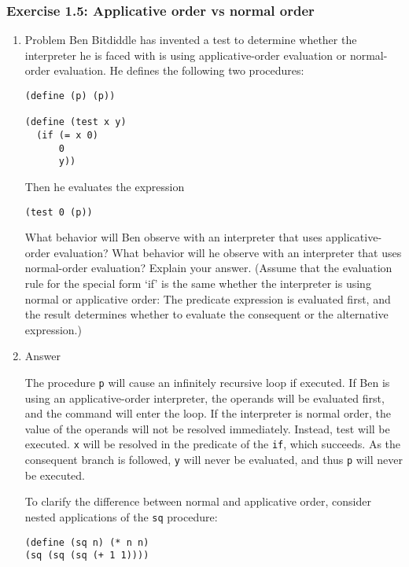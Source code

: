 \documentclass[11pt]{article}
\begin{document}
\subsubsection{Exercise 1.5: Applicative order vs normal order}
\label{sec-1-1-5}
\begin{enumerate}
\item Problem
\label{sec-1-1-5-1}
Ben Bitdiddle has invented a test to determine whether the
interpreter he is faced with is using applicative-order
evaluation or normal-order evaluation.  He defines the following
two procedures:

\begin{verbatim}
(define (p) (p))

(define (test x y)
  (if (= x 0)
      0
      y))
\end{verbatim}

Then he evaluates the expression

\begin{verbatim}
(test 0 (p))
\end{verbatim}

What behavior will Ben observe with an interpreter that uses
applicative-order evaluation?  What behavior will he observe with
an interpreter that uses normal-order evaluation?  Explain your
answer.  (Assume that the evaluation rule for the special form
`if' is the same whether the interpreter is using normal or
applicative order: The predicate expression is evaluated first,
and the result determines whether to evaluate the consequent or
the alternative expression.)
\item Answer
\label{sec-1-1-5-2}

The procedure \texttt{p} will cause an infinitely recursive loop if
executed. If Ben is using an applicative-order interpreter, the
operands will be evaluated first, and the command will enter the loop.
If the interpreter is normal order, the value of the operands will not
be resolved immediately. Instead, test will be executed. \texttt{x} will be
resolved in the predicate of the \texttt{if}, which succeeds. As the consequent
branch is followed, \texttt{y} will never be evaluated, and thus \texttt{p} will never
be executed.

To clarify the difference between normal and applicative order,
consider nested applications of the \texttt{sq} procedure:

\begin{verbatim}
(define (sq n) (* n n)
(sq (sq (sq (+ 1 1))))
\end{verbatim}


\end{enumerate}
\end{document}
